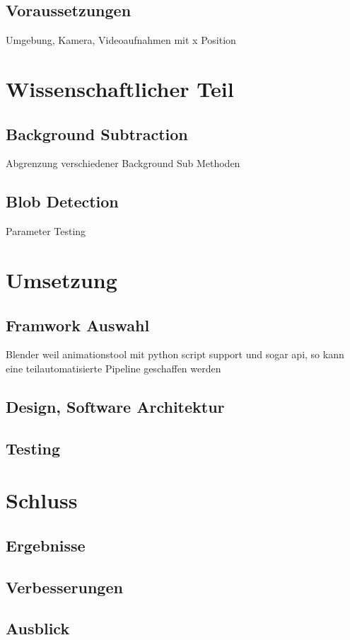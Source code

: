 \documentclass[11pt,a4paper,oldfontcommands]{memoir}
\begin{document}
\section{Voraussetzungen}
Umgebung, Kamera, Videoaufnahmen mit x Position

\chapter{Wissenschaftlicher Teil}
\section{Background Subtraction}
Abgrenzung verschiedener Background Sub Methoden
\section{Blob Detection}
Parameter Testing

\chapter{Umsetzung}
\section{Framwork Auswahl}
Blender weil animationstool mit python script support und sogar api, so kann eine teilautomatisierte Pipeline geschaffen werden
\section{Design, Software Architektur}
\section{Testing}

\chapter{Schluss}
\section{Ergebnisse}
\section{Verbesserungen}
\section{Ausblick}





\end{document}
